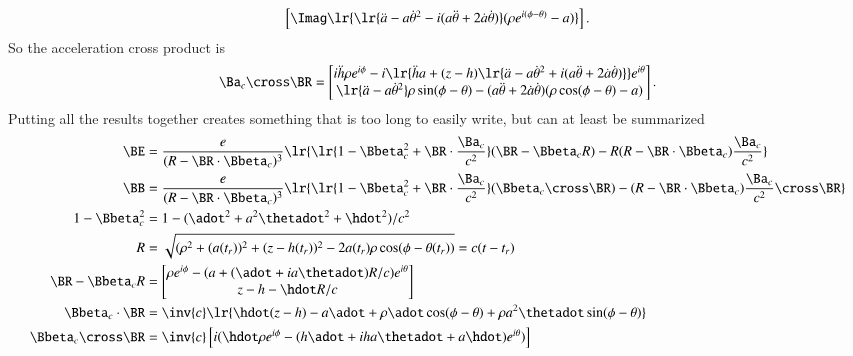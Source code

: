 {\begin{equation}
\begin{aligned}
\begin{bmatrix}
\Imag 
\lr{
   \lr{
      \ddot{a} - a {\dot{\theta}}^2 - i ( a\ddot{\theta} + 2 \dot{a} \dot{\theta} ) 
   }
   ( \rho e^{i(\phi -\theta)} - a )
}
\end{bmatrix}.
\end{aligned}
\end{equation}
%
So the acceleration cross product is
%
\begin{equation}\label{eqn:relativisticElectrodynamicsExamReflection:980}
\Ba_c \cross \BR
=
\begin{bmatrix}
i \ddot{h} \rho e^{i\phi}
- i 
\lr{
   \ddot{h} a + (z - h)
   \lr{
      \ddot{a} - a {\dot{\theta}}^2 + i ( a\ddot{\theta} + 2 \dot{a} \dot{\theta} ) 
   }
}
e^{i\theta} \\
\lr{
   \ddot{a} - a {\dot{\theta}}^2 
}
\rho \sin(\phi - \theta)
-( a\ddot{\theta} + 2 \dot{a} \dot{\theta} ) (\rho \cos(\phi -\theta) - a)
\end{bmatrix}.
\end{equation}
%
Putting all the results together creates something that is too long to easily write, but can at least be summarized
%
\begin{equation}\label{eqn:relativisticElectrodynamicsExamReflection:990}
\begin{aligned}
\BE
&=
\frac{e}{(R - \BR \cdot \Bbeta_c)^3}
\lr{
   \lr{
      1 - \Bbeta_c^2 + \BR \cdot \frac{\Ba_c}{c^2}
   }
   (\BR - \Bbeta_c R)
   - R(R - \BR \cdot \Bbeta_c) \frac{\Ba_c}{c^2}
}
\\
\BB
&=
\frac{e}{(R - \BR \cdot \Bbeta_c)^3}
\lr{
   \lr{
      1 - \Bbeta_c^2 + \BR \cdot \frac{\Ba_c}{c^2}
   }
   (\Bbeta_c \cross \BR)
   - (R - \BR \cdot \Bbeta_c) \frac{\Ba_c}{c^2} \cross \BR
}
\\
1 - \Bbeta_c^2 &= 1 - (\adot^2 + a^2 \thetadot^2 + \hdot^2)/c^2 \\
R &= \sqrt{(\rho^2 + (a(t_r))^2 + (z-h(t_r))^2 - 2 a(t_r) \rho \cos(\phi - \theta(t_r))} = c( t - t_r) \\
\BR - \Bbeta_c R &=
\begin{bmatrix}
\rho e^{i\phi} - (a + (\adot + i a\thetadot) R/c) e^{i\theta} \\
z - h - \hdot R/c
\end{bmatrix} \\
\Bbeta_c \cdot \BR &= \inv{c}
\lr{
   \hdot (z - h) -a \adot + \rho \adot \cos(\phi- \theta) + \rho a^2 \thetadot \sin(\phi - \theta) 
}
\\
\Bbeta_c \cross \BR
&=
\inv{c}
\begin{bmatrix}
i( \hdot \rho e^{i\phi} - (h \adot + i h a \thetadot + a \hdot) e^{i\theta} ) \\

\end{bmatrix}
\end{aligned}
\end{equation}}
